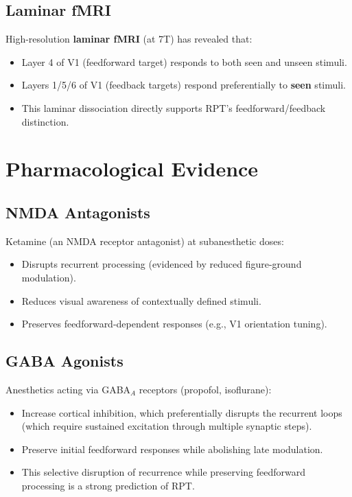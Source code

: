 \documentclass[11pt,a4paper]{report}
\begin{document}
\subsection{Laminar fMRI}

High-resolution \textbf{laminar fMRI} (at 7T) has revealed that:
\begin{itemize}[leftmargin=1.5em]
  \item Layer 4 of V1 (feedforward target) responds to both seen and unseen stimuli.
  \item Layers 1/5/6 of V1 (feedback targets) respond preferentially to \textbf{seen} stimuli.
  \item This laminar dissociation directly supports RPT's feedforward/feedback distinction.
\end{itemize}

\section{Pharmacological Evidence}

\subsection{NMDA Antagonists}

Ketamine (an NMDA receptor antagonist) at subanesthetic doses:
\begin{itemize}[leftmargin=1.5em]
  \item Disrupts recurrent processing (evidenced by reduced figure-ground modulation).
  \item Reduces visual awareness of contextually defined stimuli.
  \item Preserves feedforward-dependent responses (e.g., V1 orientation tuning).
\end{itemize}

\subsection{GABA Agonists}

Anesthetics acting via GABA$_A$ receptors (propofol, isoflurane):
\begin{itemize}[leftmargin=1.5em]
  \item Increase cortical inhibition, which preferentially disrupts the recurrent loops (which require sustained excitation through multiple synaptic steps).
  \item Preserve initial feedforward responses while abolishing late modulation.
  \item This selective disruption of recurrence while preserving feedforward processing is a strong prediction of RPT.
\end{itemize}
\end{document}
